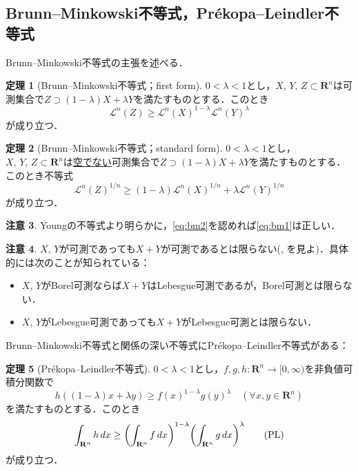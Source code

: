 \documentclass[a4j]{ltjsarticle}
\newcommand{\Rset}{\mathbf{R}}
\newcommand{\Lm}{\mathcal{L}}
\newcommand{\1}{\bm{1}}
\numberwithin{equation}{section}
\theoremstyle{definition}
\newtheorem{thm}{定理}[section]
\newtheorem{rmk}[thm]{注意}
\begin{document}
\subsection{Brunn--Minkowski不等式，Pr\'ekopa--Leindler不等式}
Brunn--Minkowski不等式の主張を述べる．
\begin{thm}[Brunn--Minkowski不等式；first form]\label{thm:bm1}
    $0<\lambda<1$とし，$X,\,Y,\,Z\subset \Rset^n$は可測集合で$Z\supset(1-\lambda)X+\lambda Y$を満たすものとする．このとき
    \begin{equation}
        \Lm^n(Z)\geq \Lm^n(X)^{1-\lambda}\Lm^n(Y)^{\lambda}\label{eq:bm1}\tag{BM1}
    \end{equation}
    が成り立つ．
\end{thm}
\begin{thm}[Brunn--Minkowski不等式；standard form]\label{thm:bm2}
    $0<\lambda<1$とし，$X,\,Y,\,Z\subset \Rset^n$は\underline{空でない}可測集合で$Z\supset(1-\lambda)X+\lambda Y$を満たすものとする．このとき不等式
    \begin{equation}
        \Lm^n(Z)^{1/n}\geq (1-\lambda)\Lm^n(X)^{1/n}+\lambda \Lm^n(Y)^{1/n}\label{eq:bm2}\tag{BM2}
    \end{equation}
    が成り立つ．
\end{thm}
\begin{rmk}
    Youngの不等式より明らかに，\eqref{eq:bm2}を認めれば\eqref{eq:bm1}は正しい．
\end{rmk}
\begin{rmk}\label{rmk:measurability}
    $X,\,Y$が可測であっても$X+Y$が可測であるとは限らない(\cite{S}, \cite{ES}を見よ)．具体的には次のことが知られている：
    \begin{itemize}
        \item $X,\,Y$がBorel可測ならば$X+Y$はLebesgue可測であるが，Borel可測とは限らない．
        \item $X,\,Y$がLebesgue可測であっても$X+Y$がLebesgue可測とは限らない．
    \end{itemize}
\end{rmk}
Brunn--Minkowski不等式と関係の深い不等式にPr\'ekopa--Leindler不等式がある：
\begin{thm}[Pr\'ekopa--Leindler不等式]\label{thm:pl}
    $0<\lambda<1$とし，$f,g,h\colon \Rset^n\to[0,\infty)$を非負値可積分関数で
    \begin{equation}
        h((1-\lambda)x+\lambda y)\geq f(x)^{1-\lambda}g(y)^{\lambda}\quad (\forall x,y\in \Rset^n)
    \end{equation}
    を満たすものとする．このとき
    \begin{equation}
        \int_{\Rset^n}h\,dx\geq \qty(\int_{\Rset^n}f\,dx)^{1-\lambda}\qty(\int_{\Rset^n}g\,dx)^{\lambda}\label{eq:pl}\tag{PL}
    \end{equation}
    が成り立つ．
\end{thm}
\end{document}
